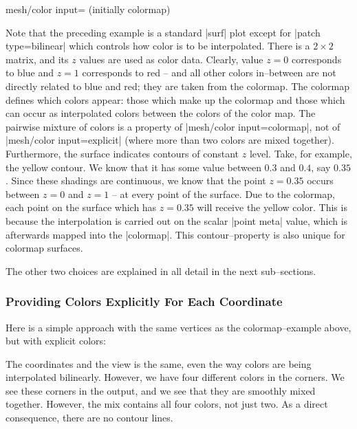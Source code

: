 {{\begin{pgfplotskey}{mesh/color input= (initially colormap)}
\begin{codeexample}[]
\end{codeexample}
\noindent Note that the preceding example is a standard |surf| plot except for |patch type=bilinear| which controls how color is to be interpolated. There is a $2 \times 2$ matrix, and its $z$ values are used as color data. Clearly, value $z=0$ corresponds to blue and $z=1$ corresponds to red -- and all other colors in--between are not directly related to blue and red; they are taken from the colormap. The colormap defines which colors appear: those which make up the colormap and those which can occur as interpolated colors between the colors of the color map. The pairwise mixture of colors is a property of |mesh/color input=colormap|, not of |mesh/color input=explicit| (where more than two colors are mixed together). Furthermore, the surface indicates contours of constant $z$ level. Take, for example, the yellow contour. We know that it has some value between $0.3$ and $0.4$, say $0.35$. Since these shadings are continuous, we know that the point $z=0.35$ occurs between $z=0$ and $z=1$ -- at every point of the surface. Due to the colormap, each point on the surface which has $z=0.35$ will receive the yellow color. This is because the interpolation is carried out on the scalar |point meta| value, which is afterwards mapped into the |colormap|. This contour--property is also unique for colormap surfaces.

The other two choices are explained in all detail in the next sub--sections.

\subsubsection{Providing Colors Explicitly For Each Coordinate}
\label{sec:surf:explicit:color}
Here is a simple approach with the same vertices as the colormap--example above, but with explicit colors:
\begin{codeexample}[]
\end{codeexample}
\noindent The coordinates and the view is the same, even the way colors are being interpolated bilinearly. However, we have four different colors in the corners. We see these corners in the output, and we see that they are smoothly mixed together. However, the mix contains all four colors, not just two. As a direct consequence, there are no contour lines. 


\end{pgfplotskey}}}
